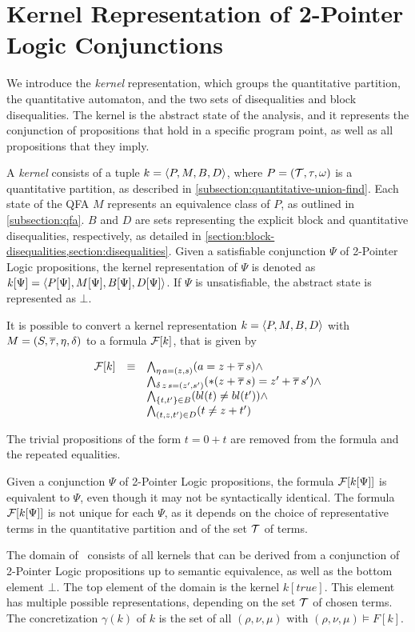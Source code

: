 



\section{Kernel Representation of 2-Pointer Logic Conjunctions}

We introduce the \emph{kernel} representation, which groups the quantitative partition, the quantitative automaton, and the two sets of disequalities and block disequalities.
The kernel is the abstract state of the analysis, and it represents the conjunction of propositions that hold in a specific program point, as well as all propositions that they imply.

A \emph{kernel} consists of a tuple $k = \langle P,M,B,D\rangle$, where $P = (\mathcal{T}, \tau, \omega)$ is a quantitative partition, as described in \cref{subsection:quantitative-union-find}.
Each state of the QFA $M$ represents an equivalence class of $P$, as outlined in \cref{subsection:qfa}.
$B$ and $D$ are sets representing the explicit block and quantitative disequalities, respectively, as detailed in \cref{section:block-disequalities,section:disequalities}.
Given a satisfiable conjunction $\Psi$ of 2-Pointer Logic propositions, the kernel representation of $\Psi$ is denoted as $k[\Psi] = \langle P[\Psi],M[\Psi],B[\Psi],D[\Psi]\rangle$.
If $\Psi$ is unsatisfiable, the abstract state is represented as $\bot$.

It is possible to convert a kernel representation $k = \langle P,M,B,D\rangle$ with $M = (S, \overline{\tau}, \eta, \delta)$ to a formula $\mathcal{F}[k]$, that is given by

\[
  \begin{array}{lll}
    \mathcal{F}[k] & \equiv & \bigwedge_{\eta\,a=(z,s)} (a = z + \overline{\tau}\,s) \land                            \\
          &        & \bigwedge_{\delta\,z\,s=(z',s')} (*(z + \overline{\tau}\,s) = z' + \overline{\tau}\,s') \land     \\
          &        & \bigwedge_{\{t,t'\}\in B} (bl(t) \neq bl(t')) \land \\
          &        & \bigwedge_{(t,z, t') \in D}(t \neq z + t')
  \end{array}
\]

The trivial propositions of the form $t = 0 + t$ are removed from the formula and the repeated equalities.

Given a conjunction $\Psi$ of 2-Pointer Logic propositions, the formula $\mathcal{F}[k[\Psi]]$ is equivalent to $\Psi$, even though it may not be syntactically identical.
The formula $\mathcal{F}[k[\Psi]]$ is not unique for each $\Psi$, as it depends on the choice of representative terms in the quantitative partition and of the set $\mathcal{T}$ of terms.

The domain of \cpo\ consists of all kernels that can be derived from a conjunction of 2-Pointer Logic propositions up to semantic equivalence, as well as the bottom element $\bot$.
The top element of the domain is the kernel $k[true]$.
This element has multiple possible representations, depending on the set $\mathcal{T}$ of chosen terms.
The concretization $\gamma(k)$ of $k$ is the set of all $(\rho, \nu, \mu)$ with $(\rho, \nu, \mu) \models F[k]$.



